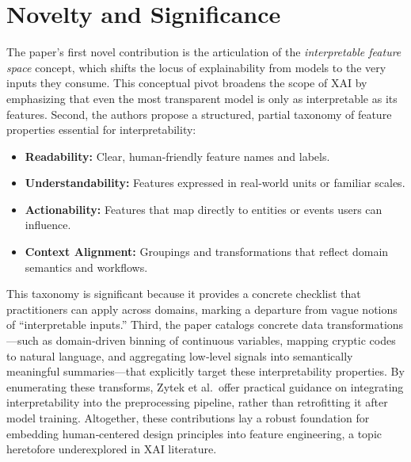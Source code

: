 \documentclass[12pt]{article}
\begin{document}
\section{Novelty and Significance}
The paper’s first novel contribution is the articulation of the \emph{interpretable feature space} concept, which shifts the locus of explainability from models to the very inputs they consume. This conceptual pivot broadens the scope of XAI by emphasizing that even the most transparent model is only as interpretable as its features. Second, the authors propose a structured, partial taxonomy of feature properties essential for interpretability: 
\begin{itemize}
    \item \textbf{Readability:} Clear, human‐friendly feature names and labels.
    \item \textbf{Understandability:} Features expressed in real‐world units or familiar scales.
    \item \textbf{Actionability:} Features that map directly to entities or events users can influence.
    \item \textbf{Context Alignment:} Groupings and transformations that reflect domain semantics and workflows.
\end{itemize}
This taxonomy is significant because it provides a concrete checklist that practitioners can apply across domains, marking a departure from vague notions of “interpretable inputs.” Third, the paper catalogs concrete data transformations—such as domain‐driven binning of continuous variables, mapping cryptic codes to natural language, and aggregating low‐level signals into semantically meaningful summaries—that explicitly target these interpretability properties. By enumerating these transforms, Zytek et al.\ offer practical guidance on integrating interpretability into the preprocessing pipeline, rather than retrofitting it after model training. Altogether, these contributions lay a robust foundation for embedding human‐centered design principles into feature engineering, a topic heretofore underexplored in XAI literature.
\end{document}
